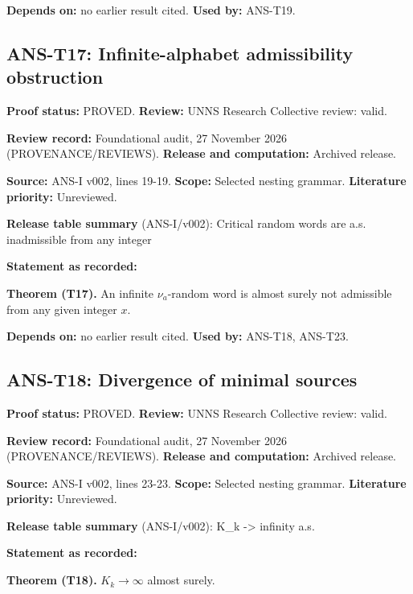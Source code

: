 \documentclass[
  11pt,
]{article}
\begin{document}
\textbf{Depends on:} no earlier result cited. \textbf{Used by:} ANS-T19.

\hypertarget{ans-t17-infinite-alphabet-admissibility-obstruction}{%
\subsection{ANS-T17: Infinite-alphabet admissibility
obstruction}\label{ans-t17-infinite-alphabet-admissibility-obstruction}}

\textbf{Proof status:} PROVED. \textbf{Review:} UNNS Research Collective
review: valid.

\textbf{Review record:} Foundational audit, 27 November 2026
(PROVENANCE/REVIEWS). \textbf{Release and computation:} Archived
release.

\textbf{Source:} ANS-I v002, lines 19-19. \textbf{Scope:} Selected
nesting grammar. \textbf{Literature priority:} Unreviewed.

\textbf{Release table summary} (ANS-I/v002): Critical random words are
a.s. inadmissible from any integer

\textbf{Statement as recorded:}

\textbf{Theorem (T17).} An infinite \(\nu_a\)-random word is almost
surely not admissible from any given integer \(x\).

\textbf{Depends on:} no earlier result cited. \textbf{Used by:} ANS-T18,
ANS-T23.

\hypertarget{ans-t18-divergence-of-minimal-sources}{%
\subsection{ANS-T18: Divergence of minimal
sources}\label{ans-t18-divergence-of-minimal-sources}}

\textbf{Proof status:} PROVED. \textbf{Review:} UNNS Research Collective
review: valid.

\textbf{Review record:} Foundational audit, 27 November 2026
(PROVENANCE/REVIEWS). \textbf{Release and computation:} Archived
release.

\textbf{Source:} ANS-I v002, lines 23-23. \textbf{Scope:} Selected
nesting grammar. \textbf{Literature priority:} Unreviewed.

\textbf{Release table summary} (ANS-I/v002): K\_k -\textgreater{}
infinity a.s.

\textbf{Statement as recorded:}

\textbf{Theorem (T18).} \(K_k\to\infty\) almost surely.
\end{document}
